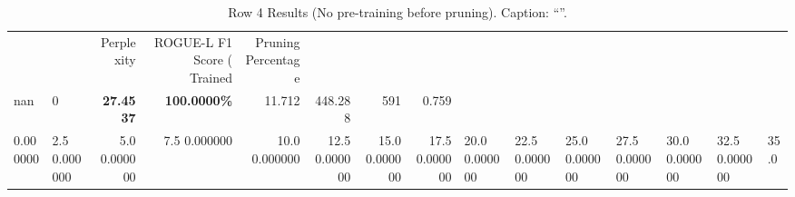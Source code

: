 \begin{table}
\caption{Row 4 Results (No pre-training before pruning). \ifshowcaption{}Caption: ``''.\fi}
\label{tab:evaluation-pipeline-4-untrained}
\begin{tabular}{llrrrrrr}
 &  & Perplexity & ROGUE-L F1 Score (%
Trained & Pruning Percentage &  &  &  &  &  &  \\
nan & 0 & \bfseries 27.4537 & \bfseries 100.0000\% & 11.712 & 448.288 & 591 & 0.759 \\
0.000000 & 2.5%
0.000000 & 5.0%
0.000000 & 7.5%
0.000000 & 10.0%
0.000000 & 12.5%
0.000000 & 15.0%
0.000000 & 17.5%
0.000000 & 20.0%
0.000000 & 22.5%
0.000000 & 25.0%
0.000000 & 27.5%
0.000000 & 30.0%
0.000000 & 32.5%
0.000000 & 35.0%

\end{tabular}
\end{table}
